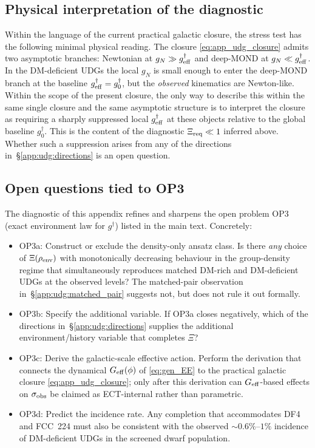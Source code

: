 \subsection{Physical interpretation of the diagnostic}
\label{app:udg:interpretation}

Within the language of the current practical galactic closure, the
stress test has the following minimal physical reading.  The
closure \eqref{eq:app_udg_closure} admits two asymptotic branches:
Newtonian at $g_N\gg g^\dagger_{\rm eff}$ and deep-MOND at
$g_N\ll g^\dagger_{\rm eff}$.  In the DM-deficient UDGs the local
$g_N$ is small enough to enter the deep-MOND branch at the
baseline $g^\dagger_{\rm eff}=g^\dagger_0$, but the
\emph{observed} kinematics are Newton-like.  Within the scope of
the present closure, the only way to describe this within the
same single closure and the same asymptotic structure is to
interpret the closure as requiring a sharply suppressed local
$g^\dagger_{\rm eff}$ at these objects relative to the global
baseline $g^\dagger_0$.  This is the content of the diagnostic
$\Xi_{\rm req}\ll 1$ inferred above.  Whether such a suppression
arises from any of the directions
in~\S\ref{app:udg:directions} is an open question.

\subsection{Open questions tied to OP3}
\label{app:udg:open_questions}

The diagnostic of this appendix refines and sharpens the open
problem OP3 (exact environment law for $g^\dagger$) listed in the
main text.  Concretely:

\begin{itemize}
\item OP3a: Construct or exclude the density-only ansatz class.  Is
  there \emph{any} choice of $\Xi(\rho_{\rm env})$ with
  monotonically decreasing behaviour in the group-density regime
  that simultaneously reproduces matched DM-rich and DM-deficient
  UDGs at the observed levels?  The matched-pair observation
  in~\S\ref{app:udg:matched_pair} suggests not, but does not rule
  it out formally.
\item OP3b: Specify the additional variable.  If OP3a closes
  negatively, which of the directions
  in~\S\ref{app:udg:directions} supplies the additional
  environment/history variable that completes $\Xi$?
\item OP3c: Derive the galactic-scale effective action.  Perform
  the derivation that connects the dynamical
  $G_{\rm eff}(\phi)$ of \eqref{eq:gen_EE} to the practical
  galactic closure \eqref{eq:app_udg_closure}; only after this
  derivation can $G_{\rm eff}$-based effects on $\sigma_{\rm obs}$
  be claimed as ECT-internal rather than parametric.
\item OP3d: Predict the incidence rate.  Any completion that
  accommodates DF4 and FCC~224 must also be consistent with the
  observed $\sim 0.6\%$--$1\%$ incidence of DM-deficient UDGs in
  the screened dwarf population.
\end{itemize}

